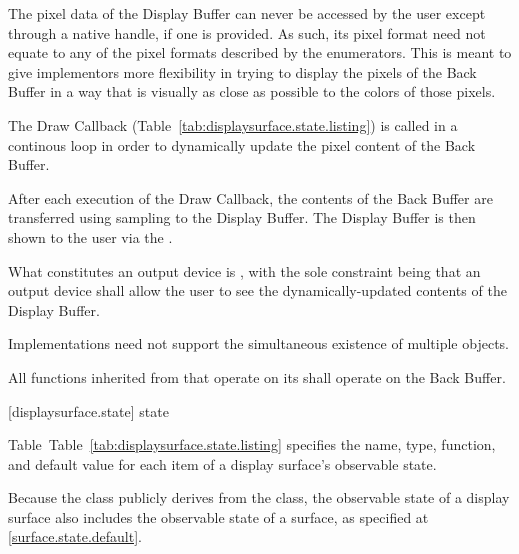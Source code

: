 \pnum
The pixel data of the Display Buffer can never be accessed by the user except through a native handle, if one is provided. As such, its pixel format need not equate to any of the pixel formats described by the  enumerators. This is meant to give implementors more flexibility in trying to display the pixels of the Back Buffer in a way that is visually as close as possible to the colors of those pixels.

\pnum
The Draw Callback (Table~\ref{tab:displaysurface.state.listing}) is called in a continous loop in order to dynamically update the pixel content of the Back Buffer.

\pnum
After each execution of the Draw Callback, the contents of the Back Buffer are transferred using sampling to the Display Buffer. The Display Buffer is then shown to the user via the .

\pnum
What constitutes an output device is , with the sole constraint being that an output device shall allow the user to see the dynamically-updated contents of the Display Buffer.

\pnum
Implementations need not support the simultaneous existence of multiple  objects.

\pnum
All functions inherited from  that operate on its \underlyingsurface shall operate on the Back Buffer.

 [displaysurface.state] { state}

\pnum
Table~Table~\ref{tab:displaysurface.state.listing} specifies the name, type, function, and default value for each item of a display surface's observable state.

\pnum
Because the  class publicly derives from the  class, the observable state of a display surface also includes the observable state of a surface, as specified at \ref{surface.state.default}.

